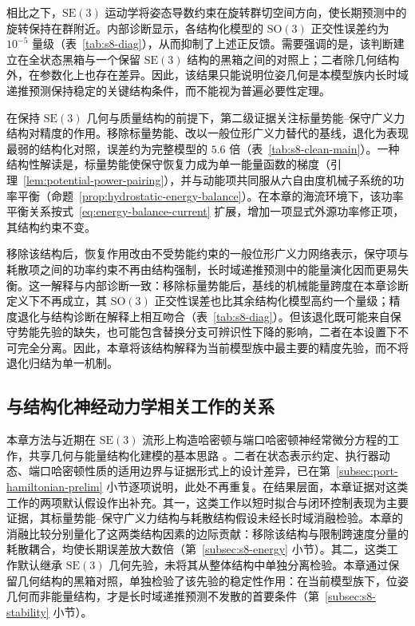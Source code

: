 \documentclass[UTF8,zihao=-4]{ctexrep}
\newcommand{\SO}{\mathrm{SO}}
\newcommand{\SE}{\mathrm{SE}}
\begin{document}
相比之下，\(\SE(3)\) 运动学将姿态导数约束在旋转群切空间方向，使长期预测中的旋转保持在群附近。内部诊断显示，各结构化模型的 \(\SO(3)\) 正交性误差约为 \(10^{-5}\) 量级（表~\ref{tab:s8-diag}），从而抑制了上述正反馈。需要强调的是，该判断建立在全状态黑箱与一个保留 \(\SE(3)\) 结构的黑箱之间的对照上；二者除几何结构外，在参数化上也存在差异。因此，该结果只能说明位姿几何是本模型族内长时域递推预测保持稳定的关键结构条件，而不能视为普遍必要性定理。

在保持 \(\SE(3)\) 几何与质量结构的前提下，第二级证据关注标量势能--保守广义力结构对精度的作用。移除标量势能、改以一般位形广义力替代的基线，退化为表现最弱的结构化对照，误差约为完整模型的 \(5.6\) 倍（表~\ref{tab:s8-clean-main}）。一种结构性解读是，标量势能使保守恢复力成为单一能量函数的梯度（引理~\ref{lem:potential-power-pairing}），并与动能项共同服从六自由度机械子系统的功率平衡（命题~\ref{prop:hydrostatic-energy-balance}）。在本章的海流环境下，该功率平衡关系按式~\eqref{eq:energy-balance-current} 扩展，增加一项显式外源功率修正项，其结构约束不变。

移除该结构后，恢复作用改由不受势能约束的一般位形广义力网络表示，保守项与耗散项之间的功率约束不再由结构强制，长时域递推预测中的能量演化因而更易失衡。这一解释与内部诊断一致：移除标量势能后，基线的机械能量跨度在本章诊断定义下不再成立，其 \(\SO(3)\) 正交性误差也比其余结构化模型高约一个量级；精度退化与结构诊断在解释上相互吻合（表~\ref{tab:s8-diag}）。但该退化既可能来自保守势能先验的缺失，也可能包含替换分支可辨识性下降的影响，二者在本设置下不可完全分离。因此，本章将该结构解释为当前模型族中最主要的精度先验，而不将退化归结为单一机制。

\subsection{与结构化神经动力学相关工作的关系}

本章方法与近期在 \(\SE(3)\) 流形上构造哈密顿与端口哈密顿神经常微分方程的工作，共享几何与能量结构化建模的基本思路 \citep{duong2021se3hamnode,duong2024liegroupphnode}。二者在状态表示约定、执行器动态、端口哈密顿性质的适用边界与证据形式上的设计差异，已在第~\ref{subsec:port-hamiltonian-prelim} 小节逐项说明，此处不再重复。在结果层面，本章证据对这类工作的两项默认假设作出补充。其一，这类工作以短时拟合与闭环控制表现为主要证据，其标量势能--保守广义力结构与耗散结构假设未经长时域消融检验。本章的消融比较分别量化了这两类结构因素的边际贡献：移除该结构与限制跨速度分量的耗散耦合，均使长期误差放大数倍（第~\ref{subsec:s8-energy} 小节）。其二，这类工作默认继承 \(\SE(3)\) 几何先验，未将其从整体结构中单独分离检验。本章通过保留几何结构的黑箱对照，单独检验了该先验的稳定性作用：在当前模型族下，位姿几何而非能量结构，才是长时域递推预测不发散的首要条件（第~\ref{subsec:s8-stability} 小节）。
\end{document}

